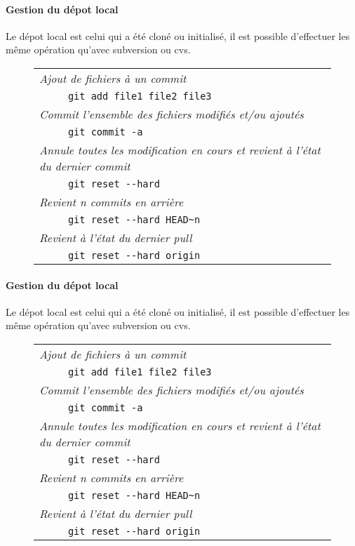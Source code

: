 \paragraph{Gestion du dépot local} Le dépot local est celui qui a été cloné ou initialisé, il est possible d'effectuer les même opération qu'avec subversion ou cvs.

\begin{figure}[H]
      \begin{tabular}{l}
	\textit{Ajout de fichiers à un commit}\\
	\verb|     git add file1 file2 file3|\\
	\textit{Commit l'ensemble des fichiers modifiés et/ou ajoutés}\\
	\verb|     git commit -a|\\
	\textit{Annule toutes les modification en cours et revient à l'état du dernier commit}\\
	\verb|     git reset --hard|\\
	\textit{Revient n commits en arrière}\\
	\verb|     git reset --hard HEAD~n|\\
	\textit{Revient à l'état du dernier pull}\\
	\verb|     git reset --hard origin|\\
      \end{tabular}
\end{figure}


\paragraph{Gestion du dépot local} Le dépot local est celui qui a été cloné ou initialisé, il est possible d'effectuer les même opération qu'avec subversion ou cvs.

\begin{figure}[H]
      \begin{tabular}{l}
	\textit{Ajout de fichiers à un commit}\\
	\verb|     git add file1 file2 file3|\\
	\textit{Commit l'ensemble des fichiers modifiés et/ou ajoutés}\\
	\verb|     git commit -a|\\
	\textit{Annule toutes les modification en cours et revient à l'état du dernier commit}\\
	\verb|     git reset --hard|\\
	\textit{Revient n commits en arrière}\\
	\verb|     git reset --hard HEAD~n|\\
	\textit{Revient à l'état du dernier pull}\\
	\verb|     git reset --hard origin|\\
      \end{tabular}
\end{figure}

